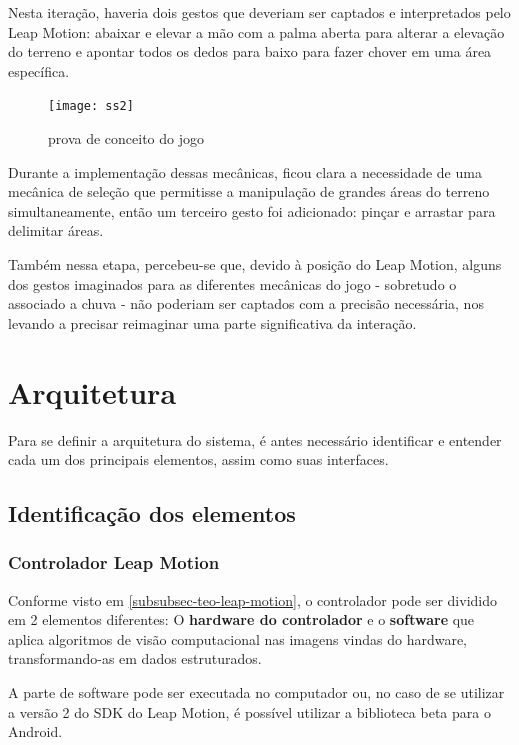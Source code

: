 Nesta iteração, haveria dois gestos que deveriam ser captados e interpretados pelo Leap Motion: abaixar e elevar a mão com a palma aberta para alterar a elevação do terreno e apontar todos os dedos para baixo para fazer chover em uma área específica.

\begin{figure}[h]
	\centering
	\texttt{[image: ss2]}
	\caption{prova de conceito do jogo}
\end{figure}

Durante a implementação dessas mecânicas, ficou clara a necessidade de uma mecânica de seleção que permitisse a manipulação de grandes áreas do terreno simultaneamente, então um terceiro gesto foi adicionado: pinçar e arrastar para delimitar áreas.

Também nessa etapa, percebeu-se que, devido à posição do Leap Motion, alguns dos gestos imaginados para as diferentes mecânicas do jogo - sobretudo o associado a chuva - não poderiam ser captados com a precisão necessária, nos levando a precisar reimaginar uma parte significativa da interação.


\section{Arquitetura}\label{sec-desenvolvimento-arquitetura}

Para se definir a arquitetura do sistema, é antes necessário identificar e entender cada um dos principais elementos, assim como suas interfaces.

\subsection{Identificação dos elementos}\label{subsec-identificacao-elementos}

\subsubsection{Controlador Leap Motion}\label{subsubsec-elemento-leapmotion}

Conforme visto em \ref{subsubsec-teo-leap-motion}, o controlador pode ser dividido em 2 elementos diferentes: O \textbf{hardware do controlador} e o \textbf{software} que aplica algoritmos de visão computacional nas imagens vindas do hardware, transformando-as em dados estruturados.

A parte de software pode ser executada no computador ou, no caso de se utilizar a versão 2 do SDK do Leap Motion, é possível utilizar a biblioteca beta para o Android.

